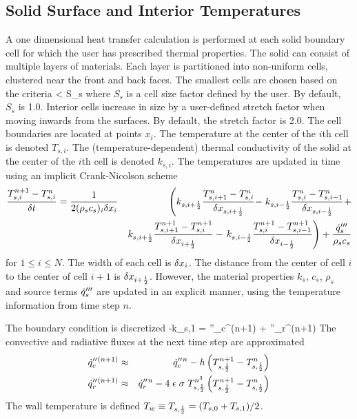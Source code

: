 \documentclass[11pt]{book}
\begin{document}
\subsection{Solid Surface and Interior Temperatures}

A one dimensional heat transfer calculation is performed at each solid
boundary cell for which the user has prescribed thermal
properties. The solid can consist of multiple layers of materials.
Each layer is partitioned into non-uniform cells, clustered near the
front and back faces.  The smallest cells are chosen based on the
criteria
\be \dx < S_s \ee
where $S_s$ is a cell size factor defined by the user. By default,
$S_s$ is 1.0.  Interior cells increase in size by a user-defined
stretch factor when moving inwards from the surfaces. By default, the
stretch factor is 2.0. The cell boundaries are located at points
$x_i$. The temperature at the center of the $i$th cell is denoted $T_{s,i}$.
The (temperature-dependent) thermal conductivity of the solid
at the center of the $i$th cell is denoted $k_{s,i}$.
The temperatures are updated in time using an implicit
Crank-Nicolson scheme
\begin{eqnarray}
    \frac{T_{s,i}^{n+1}-T_{s,i}^n}{\delta t} = \frac{1}{2 (\rho_s c_s)_i \delta x_{i} }
& & \left(
    k_{s,i+\frac{1}{2}}\frac{T_{s,i+1}^n-T_{s,i}^n}{\delta x_{s,i+\frac{1}{2}}} - \right.
    k_{s,i-\frac{1}{2}}\frac{T_{s,i}^n-T_{s,i-1}^n}{\delta x_{s,i-\frac{1}{2}}} +  \nonumber \\
& & k_{s,i+\frac{1}{2}}\frac{T_{s,i+1}^{n+1}-T_{s,i}^{n+1}}{\delta x_{i+\frac{1}{2}}} -
    \left.
    k_{s,i-\frac{1}{2}}\frac{T_{s,i}^{n+1}-T_{s,i-1}^{n+1}}{\delta x_{i-\frac{1}{2}}}
     \right)
    + \frac{\dot{q}_s'''}{\rho_s c_s}
\end{eqnarray}
for $1 \le i \le N$. The width of each cell is $\delta x_i$. The distance
from the center of cell $i$ to the center of cell $i+1$ is
$\delta x_{i+\frac{1}{2}}$. However, the material properties $k_s$, $c_s$, $\rho_s$
and source terms $\dot{q}_s'''$ are updated in an explicit manner, using
the temperature information from time step $n$.

The boundary condition is discretized
\be -k_{s,1}  = \dq''_c{}^{(n+1)} + \dq''_r{}^{(n+1)} \ee
The convective and radiative fluxes at the next time step are approximated
\begin{eqnarray}
\dot{q}''_c{}^{(n+1)} &\approx& \dot{q}''_c{}^n - h\left( T_{s,\frac{1}{2}}^{n+1} - T_{s,\frac{1}{2}}^n \right) \\
\dot{q}''_r{}^{(n+1)} &\approx& \dot{q}''_r{}^n - 4 \; \epsilon \; \sigma \; T_{s,\frac{1}{2}}^{n^3} \left(
  T_{s,\frac{1}{2}}^{n+1} - T_{s,\frac{1}{2}}^n \right)  \end{eqnarray}
The wall temperature is defined $T_w \equiv T_{s,\frac{1}{2}}=(T_{s,0}+T_{s,1})/2$.
\end{document}
